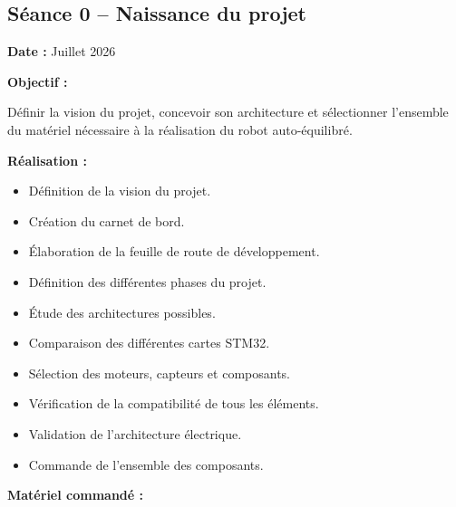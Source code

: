 \documentclass[11pt,a4paper]{article}
\begin{document}
	\subsection*{Séance 0 -- Naissance du projet}
	
	\begin{sessionbox}
		
		\textbf{Date :} Juillet 2026
		
		\vspace{0.3cm}
		
		\textbf{Objectif :}
		
		Définir la vision du projet, concevoir son architecture et sélectionner l'ensemble du matériel nécessaire à la réalisation du robot auto-équilibré.
		
		\vspace{0.3cm}
		
		\textbf{Réalisation :}
		
		\begin{itemize}
			\item Définition de la vision du projet.
			\item Création du carnet de bord.
			\item Élaboration de la feuille de route de développement.
			\item Définition des différentes phases du projet.
			\item Étude des architectures possibles.
			\item Comparaison des différentes cartes STM32.
			\item Sélection des moteurs, capteurs et composants.
			\item Vérification de la compatibilité de tous les éléments.
			\item Validation de l'architecture électrique.
			\item Commande de l'ensemble des composants.
		\end{itemize}
		
		\vspace{0.3cm}
		
		\textbf{Matériel commandé :}
		

\end{sessionbox}
\end{document}
